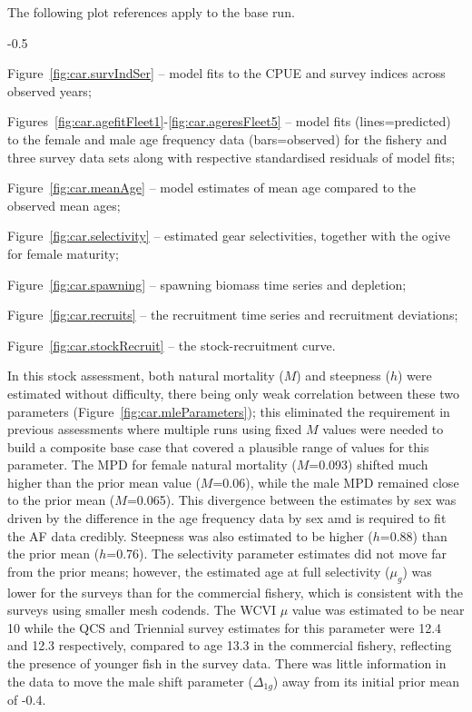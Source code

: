 \documentclass[11pt]{book}
\begin{document}
The following plot references apply to the base run.
\begin{itemize_csas}{-0.5}{}
  \item Figure~\ref{fig:car.survIndSer} -- model fits to the CPUE and survey indices across observed years;
  \item Figures~\ref{fig:car.agefitFleet1}-\ref{fig:car.ageresFleet5} -- model fits (lines=predicted) to the female and male age frequency data (bars=observed) for the fishery and three survey data sets along with respective standardised residuals of model fits;
  \item Figure~\ref{fig:car.meanAge} -- model estimates of mean age compared to the observed mean ages;
  \item Figure~\ref{fig:car.selectivity} -- estimated gear selectivities, together with the ogive for female maturity;
  \item Figure~\ref{fig:car.spawning} -- spawning biomass time series and depletion;
  \item Figure~\ref{fig:car.recruits} -- the recruitment time series and recruitment deviations;
  \item Figure~\ref{fig:car.stockRecruit} -- the stock-recruitment curve.
\end{itemize_csas}


In this \SPC{} stock assessment, both natural mortality ($M$) and steepness ($h$) were estimated without difficulty, there being only weak correlation between these two parameters (Figure~\ref{fig:car.mleParameters}); this eliminated the requirement in previous assessments where multiple runs using fixed $M$ values were needed to build a composite base case that covered a plausible range of values for this parameter.
The MPD for female natural mortality ($M$=0.093) shifted much higher than the prior mean value ($M$=0.06), while the male MPD remained close to the prior mean ($M$=0.065).
This divergence between the estimates by sex was driven by the difference in the age frequency data by sex amd is required to fit the AF data credibly.
Steepness was also estimated to be higher ($h$=0.88) than the prior mean ($h$=0.76).
The selectivity parameter estimates did not move far from the prior means; however, the estimated age at full selectivity ($\mu_g$) was lower for the surveys than for the commercial fishery, which is consistent with the surveys using smaller mesh codends.
The WCVI $\mu$ value was estimated to be near 10 while the QCS and Triennial survey estimates for this parameter were 12.4 and 12.3 respectively, compared to age 13.3 in the commercial fishery, reflecting the presence of younger fish in the survey data.
There was little information in the data to move the male shift parameter ($\Delta_{1g}$) away from its initial prior mean of -0.4.
\end{document}
